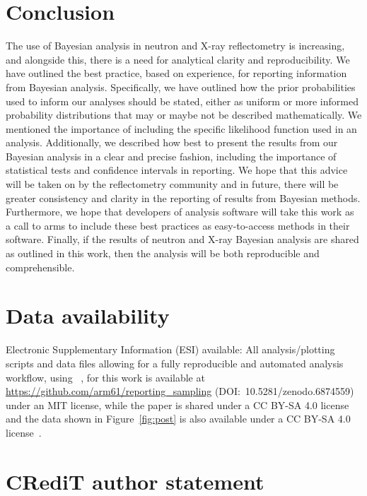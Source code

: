 \documentclass[reprint,superscriptaddress,aps,amsmath]{revtex4-2}
\begin{document}
\section{Conclusion}\label{sec:conclusions}

The use of Bayesian analysis in neutron and X-ray reflectometry is increasing, and alongside this, there is a need for analytical clarity and reproducibility. 
We have outlined the best practice, based on experience, for reporting information from Bayesian analysis. 
Specifically, we have outlined how the prior probabilities used to inform our analyses should be stated, either as uniform or more informed probability distributions that may or maybe not be described mathematically. 
We mentioned the importance of including the specific likelihood function used in an analysis. 
Additionally, we described how best to present the results from our Bayesian analysis in a clear and precise fashion, including the importance of statistical tests and confidence intervals in reporting.
We hope that this advice will be taken on by the reflectometry community and in future, there will be greater consistency and clarity in the reporting of results from Bayesian methods.
Furthermore, we hope that developers of analysis software will take this work as a call to arms to include these best practices as easy-to-access methods in their software.
Finally, if the results of neutron and X-ray Bayesian analysis are shared as outlined in this work, then the analysis will be both reproducible and comprehensible.

\section*{Data availability}

Electronic Supplementary Information (ESI) available: All analysis/plotting scripts and data files allowing for a fully reproducible and automated analysis workflow, using \showyourwork~\cite{luger_showyourwork_2022,luger_mapping_2011}, for this work is available at \url{https://github.com/arm61/reporting_sampling} (DOI:\ 10.5281/zenodo.6874559) under an MIT license, while the paper is shared under a CC BY-SA 4.0 license~\cite{mccluskey_github_2022} and the data shown in Figure~\ref{fig:post} is also available under a CC BY-SA 4.0 license~\cite{caruana_zenodo_2022}.

\section*{CR\lowercase{e}d\lowercase{i}T author statement}\label{sec:credit}
\end{document}

